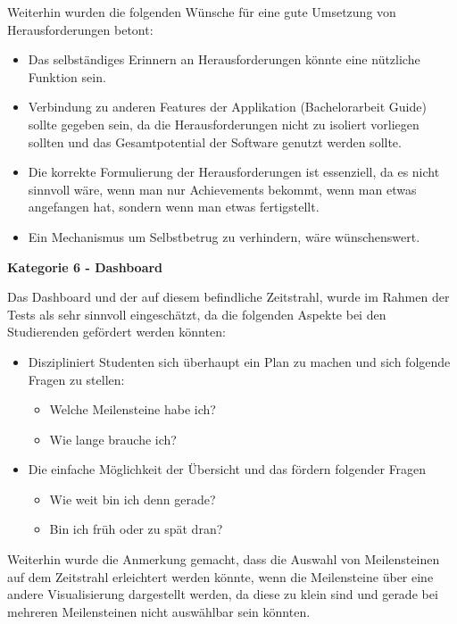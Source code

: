\documentclass[bibliography=totoc,listof=totoc,BCOR=5mm,DIV=12,oneside]{scrbook}
\begin{document}
\newpage
\par \bigskip Weiterhin wurden die folgenden Wünsche für eine gute Umsetzung von Herausforderungen betont:
\begin{itemize}
\item Das selbständiges Erinnern an Herausforderungen könnte eine nützliche Funktion sein.
\item Verbindung zu anderen Features der Applikation (Bachelorarbeit Guide) sollte gegeben sein, da die Herausforderungen nicht zu isoliert vorliegen sollten und das Gesamtpotential der Software genutzt werden sollte.
\item Die korrekte Formulierung der Herausforderungen ist essenziell, da es nicht sinnvoll wäre, wenn man nur Achievements bekommt, wenn man etwas angefangen hat, sondern wenn man etwas fertigstellt.
\item Ein Mechanismus um Selbstbetrug zu verhindern, wäre wünschenswert.
\end{itemize}

\par \bigskip \textbf{Kategorie 6 - Dashboard}
\par Das Dashboard und der auf diesem befindliche Zeitstrahl, wurde im Rahmen der Tests als sehr sinnvoll eingeschätzt, da  die folgenden Aspekte bei den Studierenden gefördert werden könnten:

\begin{itemize}
\item Diszipliniert Studenten sich überhaupt ein Plan zu machen und sich folgende Fragen zu stellen:
\begin{itemize}
\item Welche Meilensteine habe ich?
\item Wie lange brauche ich?
\end{itemize}
\item Die einfache Möglichkeit der Übersicht und das fördern folgender Fragen
\begin{itemize}
\item Wie weit bin ich denn gerade?
\item Bin ich früh oder zu spät dran?
\end{itemize}
\end{itemize}

\par Weiterhin wurde die Anmerkung gemacht, dass die Auswahl von Meilensteinen auf dem Zeitstrahl erleichtert werden könnte, wenn die Meilensteine über eine andere Visualisierung dargestellt werden, da diese zu klein sind und gerade bei mehreren Meilensteinen nicht auswählbar sein könnten.
\end{document}
